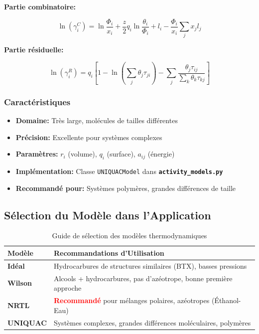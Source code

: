 \documentclass[11pt,a4paper]{article}
\newcommand{\code}[1]{\texttt{#1}}
\newcommand{\file}[1]{\texttt{\textbf{#1}}}
\begin{document}
\textbf{Partie combinatoire:}

\begin{equation}
\ln(\gamma_i^C) = \ln\frac{\Phi_i}{x_i} + \frac{z}{2}q_i\ln\frac{\theta_i}{\Phi_i} + l_i - \frac{\Phi_i}{x_i}\sum_j x_j l_j
\end{equation}

\textbf{Partie résiduelle:}

\begin{equation}
\ln(\gamma_i^R) = q_i\left[1 - \ln\left(\sum_j \theta_j \tau_{ji}\right) - \sum_j \frac{\theta_j \tau_{ij}}{\sum_k \theta_k \tau_{kj}}\right]
\end{equation}

\subsubsection{Caractéristiques}

\begin{itemize}[leftmargin=*]
    \item \textbf{Domaine:} Très large, molécules de tailles différentes
    \item \textbf{Précision:} Excellente pour systèmes complexes
    \item \textbf{Paramètres:} $r_i$ (volume), $q_i$ (surface), $a_{ij}$ (énergie)
    \item \textbf{Implémentation:} Classe \code{UNIQUACModel} dans \file{activity\_models.py}
    \item \textbf{Recommandé pour:} Systèmes polymères, grandes différences de taille
\end{itemize}

\subsection{Sélection du Modèle dans l'Application}

\begin{table}[h]
\centering
\small
\begin{tabular}{p{4cm}p{10cm}}
\toprule
\textbf{Modèle} & \textbf{Recommandations d'Utilisation} \\
\midrule
\textbf{Idéal} & Hydrocarbures de structures similaires (BTX), basses pressions \\
\textbf{Wilson} & Alcools + hydrocarbures, pas d'azéotrope, bonne première approche \\
\textbf{NRTL} & \textcolor{red}{\textbf{Recommandé}} pour mélanges polaires, azéotropes (Éthanol-Eau) \\
\textbf{UNIQUAC} & Systèmes complexes, grandes différences moléculaires, polymères \\
\bottomrule
\end{tabular}
\caption{Guide de sélection des modèles thermodynamiques}
\end{table}
\end{document}

